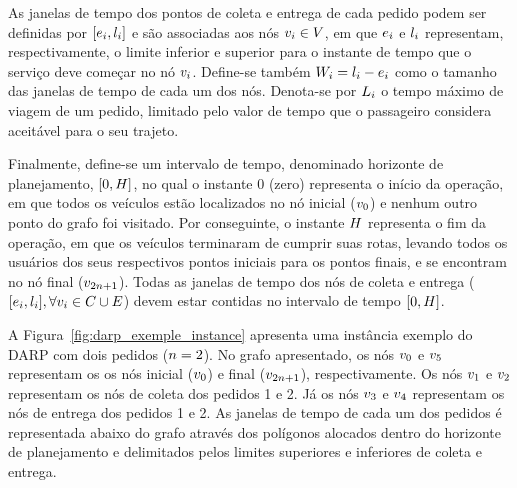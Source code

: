 As janelas de tempo dos pontos de coleta e entrega de cada pedido podem ser
definidas por $[e_{i},l_{i}]$ e são 
associadas aos nós $v_{i} \in V$, em que $e_{i}$ e 
$l_{i}$ representam, respectivamente, o limite inferior e 
superior para o instante de tempo que o serviço deve começar no nó $v_{i}$.
Define-se também $W_{i} = l_{i} 
- e_{i}$ como o tamanho das janelas de tempo 
de cada um dos nós. Denota-se por $L_i$ o tempo máximo de 
viagem de um pedido, limitado pelo valor de tempo que o passageiro considera 
aceitável para o seu trajeto. 

Finalmente, define-se um intervalo de tempo, denominado horizonte de
planejamento, $[0, H]$, no qual o instante $0$ (zero) representa
o início da operação, em que todos os veículos estão localizados no nó inicial 
($v_{0}$) e nenhum outro ponto do grafo foi visitado.
Por conseguinte, o instante $H$ representa o fim da operação, 
em que os veículos terminaram de cumprir suas rotas, levando todos os usuários 
dos seus respectivos pontos iniciais para os pontos finais, e se 
encontram no nó final ($v_{2n + 1}$). Todas as janelas de tempo dos nós de
coleta e entrega ($[e_i, l_i], 
\forall v_{i} \in C \cup E$) devem estar contidas 
no intervalo de tempo $[0, H]$.

A Figura~\ref{fig:darp_exemple_instance} apresenta uma instância exemplo
do DARP com dois pedidos ($n = 2$). 
No grafo apresentado, os nós $v_{0}$ e $v_{5}$ representam os os nós 
inicial ($v_{0}$) e final ($v_{2n + 1}$), respectivamente.
Os nós $v_{1}$ e $v_{2}$ representam os nós de coleta dos pedidos 1 e 2.
Já os nós $v_{3}$ e $v_{4}$ representam os nós de entrega dos pedidos 1 e
2.
As janelas de tempo de cada um dos pedidos é representada abaixo do grafo
através dos polígonos alocados dentro do horizonte de planejamento e
delimitados pelos limites superiores e inferiores de coleta e entrega.

